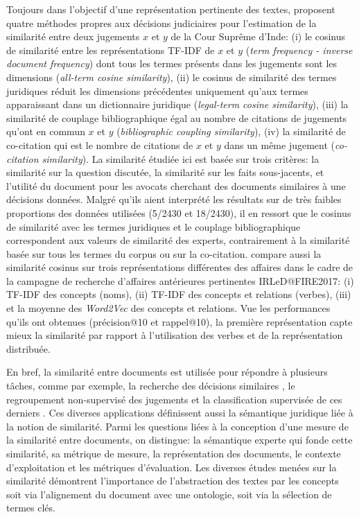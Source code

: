 Toujours dans l'objectif d'une représentation pertinente des textes, \citet{kumar2011judgmentsimilarity} proposent quatre méthodes propres aux décisions judiciaires pour l'estimation de la similarité entre deux jugements  $x$ et $y$ de la Cour Suprême d'Inde: (i) le cosinus de similarité entre les représentations TF-IDF de $x$ et $y$ (\textit{term frequency - inverse document frequency}) dont tous les termes présents dans les jugements sont les dimensions (\textit{all-term cosine similarity}), (ii) le cosinus de similarité des termes juridiques réduit les dimensions précédentes uniquement qu'aux termes apparaissant dans un dictionnaire juridique (\textit{legal-term cosine similarity}), (iii) la similarité de couplage bibliographique égal au nombre de citations de jugements qu'ont en commun $x$ et $y$ (\textit{bibliographic coupling similarity}), (iv) la similarité de co-citation qui est le nombre de citations de $x$ et $y$ dans un même jugement (\textit{co-citation similarity}). La similarité étudiée ici est basée sur trois critères: la similarité sur la question discutée, la similarité sur les faits sous-jacents, et l'utilité du document pour les avocats cherchant des documents similaires à une décisions données. Malgré qu'ils aient interprété les résultats sur de très faibles proportions des données utilisées (5/2430 et 18/2430), il en ressort que le cosinus de similarité avec les termes juridiques et le couplage bibliographique correspondent aux valeurs de similarité des experts, contrairement à la similarité basée sur tous les termes du corpus ou sur la co-citation. \citet{thenmozhi2017legalprecedretriev} compare aussi la similarité cosinus sur trois représentations différentes des affaires dans le cadre de la campagne de recherche d'affaires antérieures pertinentes  IRLeD@FIRE2017: (i) TF-IDF des concepts (noms), (ii) TF-IDF des concepts et relations (verbes), (iii) et la moyenne des \textit{Word2Vec} \citep{lemikolov2014word2vec} des concepts et relations. Vue les performances qu'ils ont obtenues (précision@10 et rappel@10), la première représentation capte mieux la similarité par rapport à l'utilisation des verbes et de la représentation distribuée. 

En bref, la similarité entre documents est utilisée pour répondre à plusieurs tâches, comme par exemple, la recherche des décisions similaires \citep{thenmozhi2017legalprecedretriev}, le regroupement non-supervisé des jugements \citep{raghuveer2012legalclusteringLDA} et la classification supervisée de ces derniers \citep{ma2018wmdchinesecase}. Ces diverses applications définissent aussi la sémantique juridique liée à la notion de similarité. Parmi les questions liées à la conception d'une mesure de la similarité entre documents, on distingue: la sémantique experte qui fonde cette similarité, sa métrique de mesure, la représentation des documents, le contexte d'exploitation et les métriques d'évaluation. Les diverses études menées sur la similarité démontrent l'importance de l'abstraction des textes par les concepts soit via l'alignement du document avec une ontologie, soit via la sélection de termes clés.

